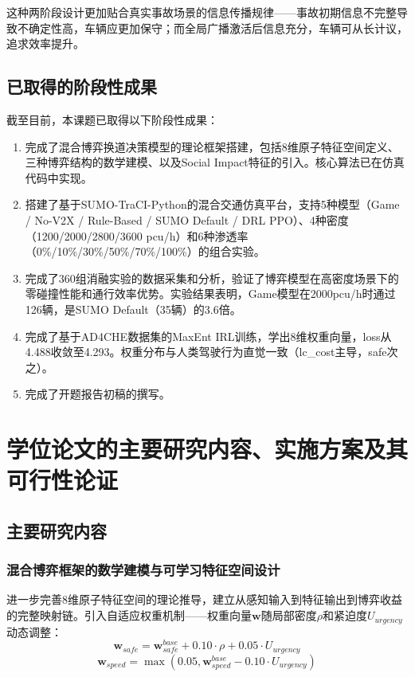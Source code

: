 这种两阶段设计更加贴合真实事故场景的信息传播规律——事故初期信息不完整导致不确定性高，车辆应更加保守；而全局广播激活后信息充分，车辆可从长计议，追求效率提升。

\subsection{已取得的阶段性成果}
截至目前，本课题已取得以下阶段性成果：

\begin{enumerate}
    \item 完成了混合博弈换道决策模型的理论框架搭建，包括8维原子特征空间定义、三种博弈结构的数学建模、以及Social Impact特征的引入。核心算法已在仿真代码中实现。
    \item 搭建了基于SUMO-TraCI-Python的混合交通仿真平台，支持5种模型（Game / No-V2X / Rule-Based / SUMO Default / DRL PPO）、4种密度（1200/2000/2800/3600 pcu/h）和6种渗透率（0\%/10\%/30\%/50\%/70\%/100\%）的组合实验。
    \item 完成了360组消融实验的数据采集和分析，验证了博弈模型在高密度场景下的零碰撞性能和通行效率优势。实验结果表明，Game模型在2000pcu/h时通过126辆，是SUMO Default（35辆）的3.6倍。
    \item 完成了基于AD4CHE数据集的MaxEnt IRL训练，学出8维权重向量，loss从4.488收敛至4.293。权重分布与人类驾驶行为直觉一致（lc\_cost主导，safe次之）。
    \item 完成了开题报告初稿的撰写。
\end{enumerate}

\section{学位论文的主要研究内容、实施方案及其可行性论证}
\subsection{主要研究内容}

\subsubsection{混合博弈框架的数学建模与可学习特征空间设计}
进一步完善8维原子特征空间的理论推导，建立从感知输入到特征输出到博弈收益的完整映射链。引入自适应权重机制——权重向量$\mathbf{w}$随局部密度$\rho$和紧迫度$U_{urgency}$动态调整：
\begin{equation}
\mathbf{w}_{safe} = \mathbf{w}_{safe}^{base} + 0.10 \cdot \rho + 0.05 \cdot U_{urgency}
\end{equation}
\begin{equation}
\mathbf{w}_{speed} = \max(0.05, \mathbf{w}_{speed}^{base} - 0.10 \cdot U_{urgency})
\end{equation}

